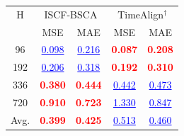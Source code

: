 \begin{tabular}{c|cc|cc}
\toprule
H & \multicolumn{2}{c|}{ISCF-BSCA} & \multicolumn{2}{c}{TimeAlign$^{\dagger}$} \\
 & MSE & MAE & MSE & MAE \\
\midrule
96 & \textcolor{blue}{\underline{0.098}} & \textcolor{blue}{\underline{0.216}} & \textcolor{red}{\textbf{0.087}} & \textcolor{red}{\textbf{0.208}} \\
192 & \textcolor{blue}{\underline{0.206}} & \textcolor{blue}{\underline{0.318}} & \textcolor{red}{\textbf{0.192}} & \textcolor{red}{\textbf{0.310}} \\
336 & \textcolor{red}{\textbf{0.380}} & \textcolor{red}{\textbf{0.444}} & \textcolor{blue}{\underline{0.442}} & \textcolor{blue}{\underline{0.473}} \\
720 & \textcolor{red}{\textbf{0.910}} & \textcolor{red}{\textbf{0.723}} & \textcolor{blue}{\underline{1.330}} & \textcolor{blue}{\underline{0.847}} \\
Avg. & \textcolor{red}{\textbf{0.399}} & \textcolor{red}{\textbf{0.425}} & \textcolor{blue}{\underline{0.513}} & \textcolor{blue}{\underline{0.460}} \\
\bottomrule
\end{tabular}

